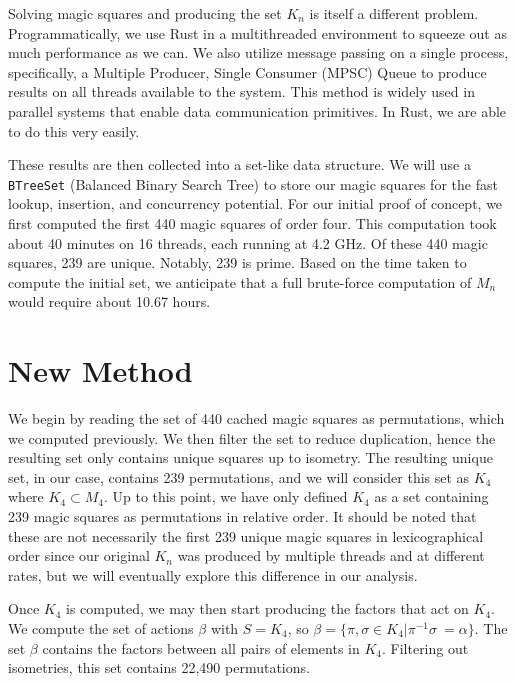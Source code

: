\documentclass[12pt]{report}
\begin{document}
\par Solving magic squares and producing the set $K_n$ is itself a different problem.
Programmatically, we use Rust in a multithreaded environment to squeeze out as much performance as
we can. We also utilize message passing on a single process, specifically, a Multiple Producer,
Single Consumer (MPSC) Queue to produce results on all threads available to the system. This method
is widely used in parallel systems that enable data communication primitives. In Rust, we are able
to do this very easily.

\par These results are then collected into a set-like data structure. We will use a
\texttt{BTreeSet} (Balanced Binary Search Tree) to store our magic squares for the fast lookup,
insertion, and concurrency potential. For our initial proof of concept, we first computed the first
440 magic squares of order four. This computation took about 40 minutes on 16 threads, each running
at 4.2 GHz. Of these 440 magic squares, 239 are unique. Notably, 239 is prime. Based on the time
taken to compute the initial set, we anticipate that a full brute-force computation of $M_n$ would
require about 10.67 hours.

\section{New Method}
\par We begin by reading the set of 440 cached magic squares as permutations, which we computed previously.
We then filter the set to
reduce duplication, hence the resulting set only contains unique squares up to isometry. The resulting unique set,
in our case, contains 239 permutations, and we will consider this set as $K_4$ where $K_4\subset M_4$. Up to this point, we
have only defined $K_4$ as a set containing 239 magic squares as permutations in relative order. It should be noted
that these are not necessarily the first 239 unique magic squares in lexicographical order since our original $K_n$ was produced
by multiple threads and at different rates, but we will eventually explore this difference in our analysis.

\par Once $K_4$ is computed, we may then start producing the factors that act on $K_4$. We compute the set
of actions $\beta$ with $S = K_4$, so  $\beta = \{\pi,\sigma\in K_4| \pi^{-1}\sigma\ = \alpha\}$.
The set $\beta$ contains the factors between all pairs of elements in $K_4$. Filtering out isometries, this set contains 22,490
permutations.
\end{document}
